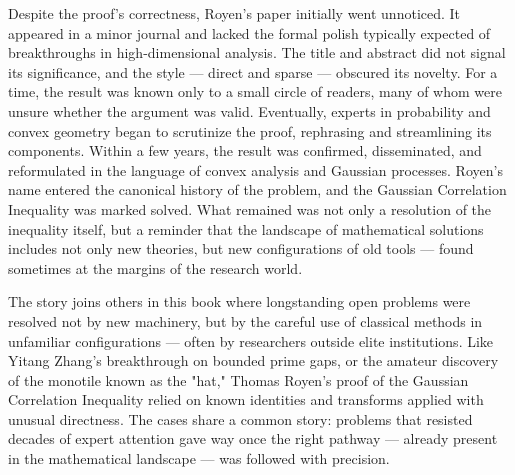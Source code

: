 Despite the proof’s correctness, Royen’s paper initially went unnoticed. It appeared in a minor journal and lacked the formal polish typically expected of breakthroughs in high-dimensional analysis. The title and abstract did not signal its significance, and the style — direct and sparse — obscured its novelty. For a time, the result was known only to a small circle of readers, many of whom were unsure whether the argument was valid. Eventually, experts in probability and convex geometry began to scrutinize the proof, rephrasing and streamlining its components. Within a few years, the result was confirmed, disseminated, and reformulated in the language of convex analysis and Gaussian processes. Royen’s name entered the canonical history of the problem, and the Gaussian Correlation Inequality was marked solved. What remained was not only a resolution of the inequality itself, but a reminder that the landscape of mathematical solutions includes not only new theories, but new configurations of old tools — found sometimes at the margins of the research world.

\begin{commentary}
The story joins others in this book where longstanding open problems were resolved not by new machinery, but by the careful use of classical methods in unfamiliar configurations — often by researchers outside elite institutions. Like Yitang Zhang's breakthrough on bounded prime gaps, or the amateur discovery of the monotile known as the "hat," Thomas Royen's proof of the Gaussian Correlation Inequality relied on known identities and transforms applied with unusual directness. The cases share a common story: problems that resisted decades of expert attention gave way once the right pathway — already present in the mathematical landscape — was followed with precision.
\end{commentary}

